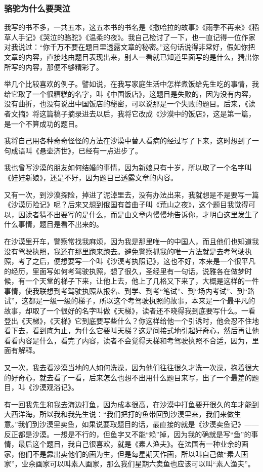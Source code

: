 \subsubsection{骆驼为什么要哭泣}
\par 我写的书不多，一共五本，这五本书的书名是《撒哈拉的故事》《雨季不再来》《稻草人手记》《哭泣的骆驼》《温柔的夜》。我自己检讨了一下，也一直记得一位作家对我说过：“你千万不要在题目里透露文章的秘密。”这句话说得非常好，假如你把文章的内容，直接地由题目表现出来，别人一看就已知道里面写的是什么，猜出你所写的内容，那便不够精彩了。
\par 举几个比较喜欢的例子。譬如说，在我写家庭生活中怎样煮饭给先生吃的事情，我给它取了一个很糟糕的名字，叫《中国饭店》，这题目是失败的，因为没有内容，没有曲折，也没有说出中国饭店的秘密，可以说那是一个失败的题目。后来，《读者文摘》将这篇稿子摘录进去以后，我将它改成《沙漠中的饭店》，这是第一篇，是一个不算成功的题目。
\par 我将自己用各种奇奇怪怪的方法在沙漠中替人看病的经过写了下来，这时想到了一句成语叫《悬壶济世》，已经有一点进步了。
\par 我也曾写沙漠的朋友如何结婚的事情，因为新娘只有十岁，所以取了一个名字叫《娃娃新娘》，还是不好，因为题目已透露文章的内容。
\par 又有一次，到沙漠探险，掉进了泥淖里去，没有办法出来，我就想是不是要写一篇《沙漠历险记》呢？后来又想到俄国有首曲子叫《荒山之夜》，这个题目我觉得可以，因读者猜不出要写的是什么，而是由文章内慢慢地告诉你，才明白这里发生了什么事情，题目是看不出来的。
\par 在沙漠里开车，警察常找我麻烦，因为我是那里唯一的中国人，而且他们也知道我没有驾驶执照，我还在那里跑来跑去。避免警察抓我的唯一方法就是去考驾驶执照，考了之后，便想要写一个叫《沙漠考执照记》，这也不好，本来是一个很平凡的经历，里面写如何考驾驶执照，想了很久，圣经里有一句话，说雅各在做梦时候，有一个天堂的梯子下来，让他上去，他上了几格又下来了，大概是这样的一件事情，使我联想到考驾驶执照从报名、到学、到考“笔试”、到“场内考试”、到“路试”，这都是一级一级的梯子，所以这个考驾驶执照的故事，本来是一个最平凡的故事，却取了一个很好的名字叫做《天梯》，读者还不晓得我到底要写什么。一看登出《天梯》，《天梯》它到底要写些什么？你这样给他一个引诱时，他会忍不住地看下去，看到底为止，为什么它要叫天梯？这是间接式地引起好奇心，然后再让他看看内容是什么，看完了内容，读者不会觉得天梯和考驾驶执照不合适，因为，里面有解释。
\par 又一次，我去看沙漠当地的人如何洗澡，因为他们往往很久才洗一次澡，抱着很大的好奇心，就去看了一看，后来怎么也想不出用什么题目来写，出了一个最差的题目，叫《沙漠观浴记》。
\par 有一回我先生和我去海边打鱼，因为成本很高，在沙漠中打鱼要开很久的车才能到大西洋海，所以我和我先生说：“我们把打的鱼带回到沙漠里来，我们来做生意。”我们到沙漠里卖鱼，如果说要取题目的话，最直接的就是《沙漠卖鱼记》——反正都是沙漠。一想是不行的，但鱼字又不能“赖”掉，因为我的确就是写“鱼”的事情，最后这个题目，我自己很喜欢，就是《素人渔夫》。在法国有一种业余的画家，他们不是靠出卖他们的画为生，但是每星期天作画，所以叫自己做“素人画家”，业余画家可以叫素人画家，那么我们星期六卖鱼也应该可以叫“素人渔夫”。
